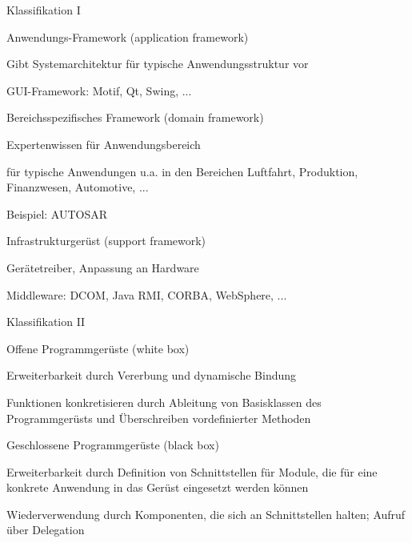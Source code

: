 \documentclass[a4paper]{article}
\begin{document}
\begin{multicols}{3}
  Klassifikation I
  \begin{itemize*}
    \item Anwendungs-Framework (application framework)
          \begin{itemize*}
            \item Gibt Systemarchitektur für typische Anwendungsstruktur vor
            \item GUI-Framework: Motif, Qt, Swing, ...
          \end{itemize*}
    \item Bereichsspezifisches Framework (domain framework)
          \begin{itemize*}
            \item Expertenwissen für Anwendungsbereich
            \item für typische Anwendungen u.a. in den Bereichen Luftfahrt, Produktion, Finanzwesen, Automotive, ...
            \item Beispiel: AUTOSAR
          \end{itemize*}
    \item Infrastrukturgerüst (support framework)
          \begin{itemize*}
            \item Gerätetreiber, Anpassung an Hardware
            \item Middleware: DCOM, Java RMI, CORBA, WebSphere, ...
          \end{itemize*}
  \end{itemize*}

  Klassifikation II
  \begin{itemize*}
    \item Offene Programmgerüste (white box)
          \begin{itemize*}
            \item Erweiterbarkeit durch Vererbung und dynamische Bindung
            \item Funktionen konkretisieren durch Ableitung von Basisklassen des Programmgerüsts und Überschreiben vordefinierter Methoden
          \end{itemize*}
    \item Geschlossene Programmgerüste (black box)
          \begin{itemize*}
            \item Erweiterbarkeit durch Definition von Schnittstellen für Module, die für eine konkrete Anwendung in das Gerüst eingesetzt werden können
            \item Wiederverwendung durch Komponenten, die sich an Schnittstellen halten; Aufruf über Delegation
          \end{itemize*}
  \end{itemize*}



\end{multicols}
\end{document}
